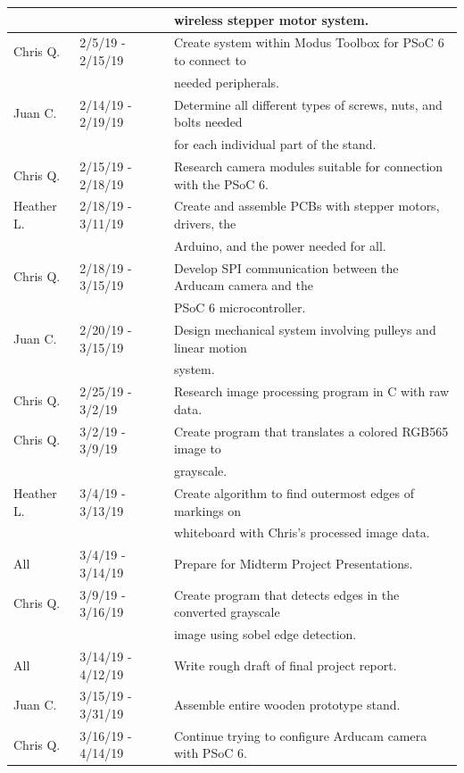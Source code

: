 \begin{table} [H]
\begin{tabular}{|l|l|l|}
				&						& wireless stepper motor system. \\
		\hline
		Chris Q. & 2/5/19 - 2/15/19 	& Create system within Modus Toolbox for PSoC 6 to connect to \\
				&						& needed peripherals. \\
		\hline
		Juan C. & 2/14/19 - 2/19/19 	& Determine all different types of screws, nuts, and bolts needed \\
				&						& for each individual part of the stand. \\
		\hline
		Chris Q. & 2/15/19 - 2/18/19 	& Research camera modules suitable for connection with the PSoC 6. \\
		\hline
		Heather L. & 2/18/19 - 3/11/19 	& Create and assemble PCBs with stepper motors, drivers, the \\ 
				&						& Arduino, and the power needed for all. \\
		\hline
		Chris Q. & 2/18/19 - 3/15/19 	& Develop SPI communication between the Arducam camera and the \\ 		&						& PSoC 6 microcontroller. \\
		\hline
		Juan C. & 2/20/19 - 3/15/19 	& Design mechanical system involving pulleys and linear motion \\
				&						& system. \\
		\hline
		Chris Q. & 2/25/19 - 3/2/19 	& Research image processing program in C with raw data. \\
		\hline
		Chris Q. & 3/2/19 - 3/9/19 		& Create program that translates a colored RGB565 image to \\
				&						& grayscale. \\
				\hline
		Heather L. & 3/4/19 - 3/13/19 	& Create algorithm to find outermost edges of markings on \\
				&						& whiteboard with Chris's processed image data. \\
		\hline
		All & 3/4/19 - 3/14/19 			& Prepare for Midterm Project Presentations. \\
		\hline
		Chris Q. & 3/9/19 - 3/16/19 	& Create program that detects edges in the converted grayscale \\ 		&						& image using sobel edge detection. \\
		\hline
		All & 3/14/19 - 4/12/19 		& Write rough draft of final project report. \\
		\hline
		Juan C. & 3/15/19 - 3/31/19 	& Assemble entire wooden prototype stand. \\
		\hline
		Chris Q. & 3/16/19 - 4/14/19 	& Continue trying to configure Arducam camera with PSoC 6. \\

\end{tabular}
\end{table}
